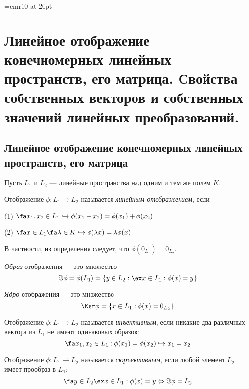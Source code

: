 \font\Large=cmr10 at 20pt
\def\fudge#1{\smash{\hbox{\Large#1}}}
\chapter[Линейное отображение конечномерных линейных прост\-ранств, его матрица. Свойства собственных векторов и собственных значений линейных преобразований.]{Линейное отображение конечномерных линейных пространств, его матрица. Свойства собственных векторов и собственных значений линейных преобразований.}
\section{Линейное отображение конечномерных линейных пространств, его матрица}
  Пусть $L_1$ и $L_2$ --- линейные пространства над одним  и тем же полем $K$.
  \begin{defn}
  Отображение $\phi: L_1\rightarrow L_2$ называется \textit{линейным отображением}, если
  
  (1) $\fa x_1,x_2 \in L_1 \hookrightarrow \phi(x_1+x_2)=\phi(x_1)+\phi(x_2)$
  
  (2) $\fa x \in L_1 \fa \lambda \in K \hookrightarrow \phi(\lambda x)=\lambda \phi(x)$
  \end{defn}
  В частности, из определения следует, что $\phi(0_{L_1})=0_{L_2}$.
  \begin{defn}
    \textit{Образ} отображения --- это множество 
    \begin{equation}
    \Im\phi=\phi(L_1)=\{y\in L_2: \ex x\in L_1: \phi(x)=y\}
    \end{equation}
  \end{defn}
  \begin{defn}
    \textit{Ядро} отображения --- это множество 
    \begin{equation}
    \Ker\phi=\{x\in L_1: \phi(x)=0_{L_2}\}
    \end{equation}
  \end{defn}
  \begin{defn}
  Отображение $\phi: L_1\rightarrow L_2$ называется \textit{инъективным}, если никакие два различных вектора из $L_1$ не имеют одинаковых образов:
  \begin{equation}\label{22.1.inject}
    \fa x_1,x_2 \in L_1: \phi(x_1)=\phi(x_2) \hookrightarrow x_1=x_2
  \end{equation}
  \end{defn}  
  \begin{defn}
  Отображение $\phi: L_1\rightarrow L_2$ называется \textit{сюръективным}, если любой элемент $L_2$ имеет прообраз в $L_1$:
  \begin{equation}\label{22.1.surject}
    \fa y \in L_2 \ex x \in L_1: \phi(x)=y \Leftrightarrow \Im \phi = L_2
  \end{equation}
  \end{defn}  
  
